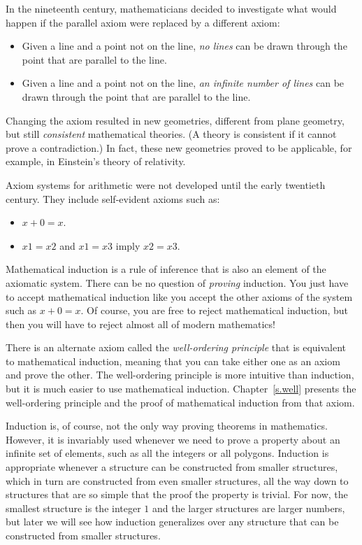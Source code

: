 \documentclass[11pt,a4paper]{report}
\begin{document}
In the nineteenth century, mathematicians decided to investigate what would happen if the parallel axiom were replaced by a different axiom:
\begin{itemize}
\item Given a line and a point not on the line, \emph{no lines} can be drawn through the point that are parallel to the line.
\item Given a line and a point not on the line, \emph{an infinite number of lines} can be drawn through the point that are parallel to the line.
\end{itemize}
Changing the axiom resulted in new geometries, different from plane geometry, but still \emph{consistent} mathematical theories. (A theory is consistent if it cannot prove a contradiction.) In fact, these new geometries proved to be applicable, for example, in Einstein's theory of relativity.

Axiom systems for arithmetic were not developed until the early twentieth century. They include self-evident axioms such as:
\begin{itemize}
\item $x+0=x$.
\item $x1=x2$ and $x1=x3$ imply $x2=x3$.
\end{itemize}
Mathematical induction is a rule of inference that is also an element of the axiomatic system. There can be no question of \emph{proving} induction. You just have to accept mathematical induction like you accept the other axioms of the system such as $x+0=x$. Of course, you are free to reject mathematical induction, but then you will have to reject almost all of modern mathematics!

There is an alternate axiom called the \emph{well-ordering principle} that is equivalent to mathematical induction, meaning that you can take either one as an axiom and prove the other. The well-ordering principle is more intuitive than induction, but it is much easier to use mathematical induction. Chapter~\ref{s.well} presents the well-ordering principle and the proof of mathematical induction from that axiom.

Induction is, of course, not the only way proving theorems in mathematics. However, it is invariably used whenever we need to prove a property about an infinite set of elements, such as all the integers or all polygons. Induction is appropriate whenever a structure can be constructed from smaller structures, which in turn are constructed from even smaller structures, all the way down to structures that are so simple that the proof the property is trivial. For now, the smallest structure is the integer $1$ and the larger structures are larger numbers, but later we will see how induction generalizes over any structure that can be constructed from smaller structures.
\end{document}
